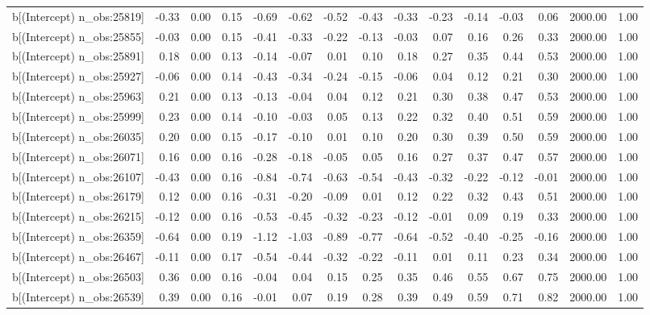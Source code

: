\begin{table}[ht]
\begin{tabular}{rrrrrrrrrrrrrrr}
  b[(Intercept) n\_obs:25819] & -0.33 & 0.00 & 0.15 & -0.69 & -0.62 & -0.52 & -0.43 & -0.33 & -0.23 & -0.14 & -0.03 & 0.06 & 2000.00 & 1.00 \\ 
  b[(Intercept) n\_obs:25855] & -0.03 & 0.00 & 0.15 & -0.41 & -0.33 & -0.22 & -0.13 & -0.03 & 0.07 & 0.16 & 0.26 & 0.33 & 2000.00 & 1.00 \\ 
  b[(Intercept) n\_obs:25891] & 0.18 & 0.00 & 0.13 & -0.14 & -0.07 & 0.01 & 0.10 & 0.18 & 0.27 & 0.35 & 0.44 & 0.53 & 2000.00 & 1.00 \\ 
  b[(Intercept) n\_obs:25927] & -0.06 & 0.00 & 0.14 & -0.43 & -0.34 & -0.24 & -0.15 & -0.06 & 0.04 & 0.12 & 0.21 & 0.30 & 2000.00 & 1.00 \\ 
  b[(Intercept) n\_obs:25963] & 0.21 & 0.00 & 0.13 & -0.13 & -0.04 & 0.04 & 0.12 & 0.21 & 0.30 & 0.38 & 0.47 & 0.53 & 2000.00 & 1.00 \\ 
  b[(Intercept) n\_obs:25999] & 0.23 & 0.00 & 0.14 & -0.10 & -0.03 & 0.05 & 0.13 & 0.22 & 0.32 & 0.40 & 0.51 & 0.59 & 2000.00 & 1.00 \\ 
  b[(Intercept) n\_obs:26035] & 0.20 & 0.00 & 0.15 & -0.17 & -0.10 & 0.01 & 0.10 & 0.20 & 0.30 & 0.39 & 0.50 & 0.59 & 2000.00 & 1.00 \\ 
  b[(Intercept) n\_obs:26071] & 0.16 & 0.00 & 0.16 & -0.28 & -0.18 & -0.05 & 0.05 & 0.16 & 0.27 & 0.37 & 0.47 & 0.57 & 2000.00 & 1.00 \\ 
  b[(Intercept) n\_obs:26107] & -0.43 & 0.00 & 0.16 & -0.84 & -0.74 & -0.63 & -0.54 & -0.43 & -0.32 & -0.22 & -0.12 & -0.01 & 2000.00 & 1.00 \\ 
  b[(Intercept) n\_obs:26179] & 0.12 & 0.00 & 0.16 & -0.31 & -0.20 & -0.09 & 0.01 & 0.12 & 0.22 & 0.32 & 0.43 & 0.51 & 2000.00 & 1.00 \\ 
  b[(Intercept) n\_obs:26215] & -0.12 & 0.00 & 0.16 & -0.53 & -0.45 & -0.32 & -0.23 & -0.12 & -0.01 & 0.09 & 0.19 & 0.33 & 2000.00 & 1.00 \\ 
  b[(Intercept) n\_obs:26359] & -0.64 & 0.00 & 0.19 & -1.12 & -1.03 & -0.89 & -0.77 & -0.64 & -0.52 & -0.40 & -0.25 & -0.16 & 2000.00 & 1.00 \\ 
  b[(Intercept) n\_obs:26467] & -0.11 & 0.00 & 0.17 & -0.54 & -0.44 & -0.32 & -0.22 & -0.11 & 0.01 & 0.11 & 0.23 & 0.34 & 2000.00 & 1.00 \\ 
  b[(Intercept) n\_obs:26503] & 0.36 & 0.00 & 0.16 & -0.04 & 0.04 & 0.15 & 0.25 & 0.35 & 0.46 & 0.55 & 0.67 & 0.75 & 2000.00 & 1.00 \\ 
  b[(Intercept) n\_obs:26539] & 0.39 & 0.00 & 0.16 & -0.01 & 0.07 & 0.19 & 0.28 & 0.39 & 0.49 & 0.59 & 0.71 & 0.82 & 2000.00 & 1.00 \\ 

\end{tabular}
\end{table}
